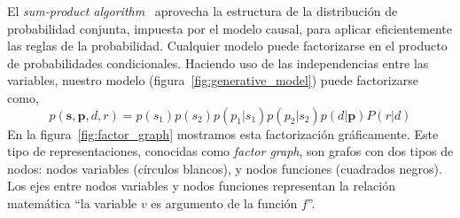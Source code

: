 \documentclass[a4paper,11pt]{book}
\theoremstyle{definition}
\begin{document}
El \emph{sum-product algorithm}~\cite{Kschischang2001} aprovecha la estructura de la distribuci\'on de probabilidad conjunta, impuesta por el modelo causal, para aplicar eficientemente las reglas de la probabilidad.
%
Cualquier modelo puede factorizarse en el producto de probabilidades condicionales.
%
Haciendo uso de las independencias entre las variables, nuestro modelo (figura~\ref{fig:generative_model}) puede factorizarse como,
%
\begin{equation} \label{eq:factorization}
 p(\bm{s},\bm{p},d,r) = p(s_1)p(s_2)p(p_1|s_1)p(p_2|s_2)p(d|\bm{p})P(r|d)
\end{equation}
%
En la figura~\ref{fig:factor_graph} mostramos esta factorizaci\'on gr\'aficamente.
%
Este tipo de representaciones, conocidas como \emph{factor graph}, son grafos con dos tipos de nodos: nodos variables (c\'irculos blancos), y nodos funciones (cuadrados negros).
%
Los ejes entre nodos variables y nodos funciones representan la relaci\'on matem\'atica ``la variable $v$ es argumento de la funci\'on $f$''.
%
\end{document}
